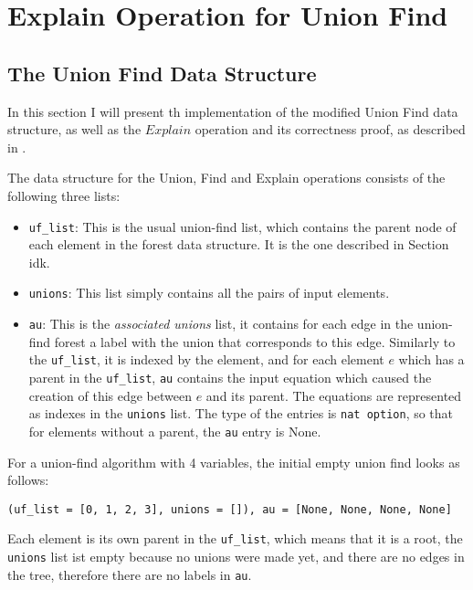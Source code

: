 
\chapter{Explain Operation for Union Find}\label{chapter:union_find}

\section{The Union Find Data Structure}


In this section I will present th implementation of the modified Union Find data structure, as well as the $Explain$ operation and its correctness proof, as described in \cite{Nieuwenhuis}.

The data structure for the Union, Find and Explain operations consists of the following three lists:

\begin{itemize}
	\item \lstinline{uf_list}: This is the usual union-find list, which contains the parent node of each element in the forest data structure. It is the one described in Section idk.
	
	\item \lstinline{unions}: This list simply contains all the pairs of input elements. 
	
	\item \lstinline{au}: This is the \emph{associated unions} list,  it contains for each edge in the union-find forest a label with the union that corresponds to this edge. Similarly to the \lstinline{uf_list}, it is indexed by the element, and for each element $e$ which has a parent in the \lstinline{uf_list}, \lstinline{au} contains the input equation which caused the creation of this edge between $e$ and its parent. The equations are represented as indexes in the \lstinline{unions} list. The type of the entries is \lstinline{nat option}, so that for elements without a parent, the \lstinline{au} entry is None.
\end{itemize}

\begin{exmp}\label{empty_ufe}
For a union-find algorithm with 4 variables, the initial empty union find looks as follows: 
\begin{lstlisting}
(uf_list = [0, 1, 2, 3], unions = []), au = [None, None, None, None]
\end{lstlisting}
Each element is its own parent in the \lstinline{uf_list}, which means that it is a root, the \lstinline{unions} list ist empty because no unions were made yet, and there are no edges in the tree, therefore there are no labels in \lstinline{au}.
\end{exmp}

